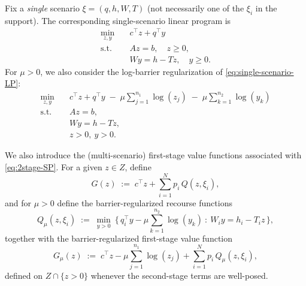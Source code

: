 \documentclass[11pt]{article}
\theoremstyle{plain}
\theoremstyle{definition}
\theoremstyle{remark}
\begin{document}
Fix a \emph{single} scenario $\xi=(q,h,W,T)$ (not necessarily one of the $\xi_i$ in the support).
The corresponding single-scenario linear program is
\begin{equation}\label{eq:single-scenario-LP}
\begin{aligned}
  \min_{z,y}\quad & c^\top z + q^\top y \\
  \text{s.t.}\quad & Az=b,\quad z\ge 0,\\
  & Wy = h - Tz,\quad y\ge 0.
\end{aligned}
\end{equation}
For $\mu>0$, we also consider the log-barrier regularization of \eqref{eq:single-scenario-LP}:
\begin{equation}\label{eq:single-scenario-barrier}
\begin{aligned}
  \min_{z,y}\quad & c^\top z + q^\top y\;-\;\mu\sum_{j=1}^{n_1}\log(z_j)\;-\;\mu\sum_{k=1}^{n_2}\log(y_k)\\
  \text{s.t.}\quad & Az=b,\\
  & Wy = h - Tz,\\
  & z>0,\ y>0.
\end{aligned}
\end{equation}

We also introduce the (multi-scenario) first-stage value functions associated with \eqref{eq:2stage-SP}.
For a given $z\in Z$, define
\begin{equation}\label{eq:G-def}
  G(z)\;:=\;c^\top z + \sum_{i=1}^N p_i\,Q(z,\xi_i),
\end{equation}
and for $\mu>0$ define the barrier-regularized recourse functions
\begin{equation}\label{eq:Qmu-def}
  Q_\mu(z,\xi_i)\;:=\;\min_{y>0}\ \Big\{\, q_i^\top y - \mu\sum_{k=1}^{n_2}\log(y_k)\ :\ W_i y = h_i - T_i z \,\Big\},
\end{equation}
together with the barrier-regularized first-stage value function
\begin{equation}\label{eq:Gmu-def}
  G_\mu(z)\;:=\;c^\top z - \mu\sum_{j=1}^{n_1}\log(z_j) + \sum_{i=1}^N p_i\,Q_\mu(z,\xi_i),
\end{equation}
defined on $Z\cap\{z>0\}$ whenever the second-stage terms are well-posed.
\end{document}
